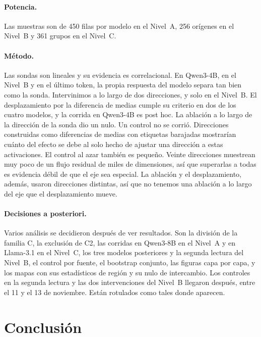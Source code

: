 \documentclass[10pt]{article}
\begin{document}
\paragraph{Potencia.}
Las muestras son de 450 filas por modelo en el Nivel~A, 256 orígenes en el Nivel~B y 361 grupos en el Nivel~C.

\paragraph{Método.}
Las sondas son lineales y su evidencia es correlacional. En Qwen3-4B, en el Nivel~B y en el último token, la propia respuesta del modelo separa tan bien como la sonda. Intervinimos a lo largo de dos direcciones, y solo en el Nivel~B. El desplazamiento por la diferencia de medias cumple
su criterio en dos de los cuatro modelos, y la corrida en Qwen3-4B es post hoc. La ablación a lo largo de la dirección
de la sonda dio un nulo.
Un control no se corrió. Direcciones construidas como diferencias de medias con etiquetas barajadas mostrarían cuánto
del efecto se debe al solo hecho de ajustar una dirección a estas activaciones.
El control al azar también es pequeño. Veinte direcciones muestrean muy poco de un flujo residual de miles de
dimensiones, así que superarlas a todas es evidencia débil de que el eje sea especial. La ablación y el desplazamiento,
además, usaron direcciones distintas, así que no tenemos una ablación a lo largo del eje que el desplazamiento mueve.

\paragraph{Decisiones a posteriori.}
Varios análisis se decidieron después de ver resultados. Son la división de la familia C, la exclusión de C2, las corridas en Qwen3-8B en el Nivel~A y en Llama-3.1 en el Nivel~C, los tres modelos posteriores y la segunda lectura del Nivel~B, el
control por fuente, el bootstrap conjunto, las figuras capa por capa, y los mapas con sus estadísticos de región y
su nulo de intercambio. Los controles en la segunda lectura y las dos intervenciones del Nivel~B llegaron después, entre el 11 y el 13
de noviembre. Están rotulados como tales donde aparecen.

\section{Conclusión}
\end{document}
